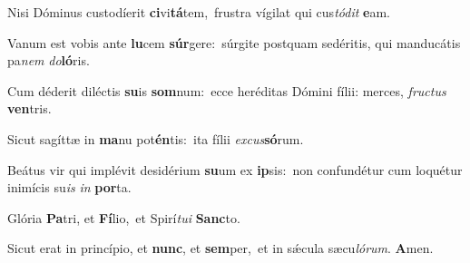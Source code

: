 \setcounter{versecount}{2}

\vs Nisi Dóminus custodíerit \textbf{ci}vi\textbf{tá}tem,~\redgreheightstar frustra vígilat qui cus\textit{tó}\textit{dit} \textbf{e}am.

\vs Vanum est vobis ante \textbf{lu}cem \textbf{súr}gere:~\redgreheightstar súrgite postquam sedéritis, qui manducátis pa\textit{nem} \textit{do}\textbf{ló}ris.

\vs Cum déderit diléctis \textbf{su}is \textbf{som}num:~\redgreheightstar ecce heréditas Dómini fílii: merces, \textit{fruc}\textit{tus} \textbf{ven}tris.

\vs Sicut sagíttæ in \textbf{ma}nu pot\textbf{én}tis:~\redgreheightstar ita fílii \textit{ex}\textit{cus}\textbf{só}rum.

\vs Beátus vir qui implévit desidérium \textbf{su}um ex \textbf{ip}sis:~\redgreheightstar non confundétur cum loquétur inimícis su\textit{is} \textit{in} \textbf{por}ta.

\vs Glória \textbf{Pa}tri, et \textbf{Fí}lio,~\redgreheightstar et Spirí\textit{tu}\textit{i} \textbf{Sanc}to.

\vs Sicut erat in princípio, et \textbf{nunc}, et \textbf{sem}per,~\redgreheightstar et in sǽcula sæcu\textit{ló}\textit{rum}. \textbf{A}men.

